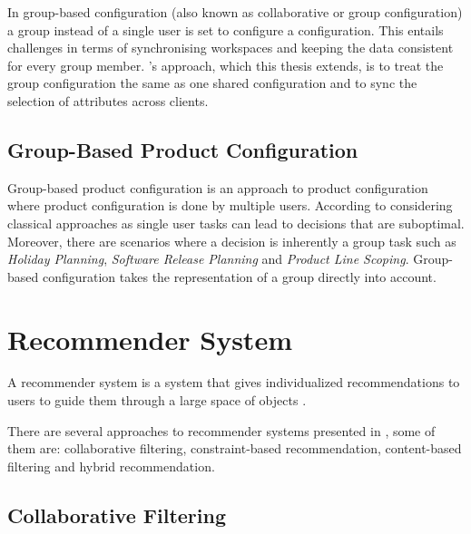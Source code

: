In group-based configuration (also known as collaborative or group configuration) a group instead of a single user is set to configure a configuration. This entails challenges in terms of synchronising  workspaces and keeping the data consistent for every group member. \citeauthor{raabKollaborativeProduktkonfigurationEchtzeit2019}'s \cite{raabKollaborativeProduktkonfigurationEchtzeit2019} approach, which this thesis extends, is to treat the group configuration the same as one shared configuration and to sync the selection of attributes across clients.

\subsection{Group-Based Product Configuration}
\label{sec:Foundations:GroupBasedProductConfiguration}

Group-based product configuration is an approach to product configuration where product configuration is done by multiple users. According to \citeauthor{felferningGroupBasedConfiguration2016} \cite{felferningGroupBasedConfiguration2016} considering classical approaches as single user tasks can lead to decisions that are suboptimal. Moreover, there are scenarios where a decision is inherently a group task such as \emph{Holiday Planning}, \emph{Software Release Planning} and \emph{Product Line Scoping}. Group-based configuration takes the representation of a group directly into account.

\section{Recommender System}
\label{sec:Foundations:RecommenderSystem}

A recommender system is a system that gives individualized recommendations to users to guide them through a large space of objects \cite[~ p. 331]{burkeHybridRecommenderSystems2002}.

There are several approaches to recommender systems presented in \cite{felfernigGroupRecommenderSystems2018}, some of them are: collaborative filtering, constraint-based recommendation, content-based filtering and hybrid recommendation.

\subsection{Collaborative Filtering}

